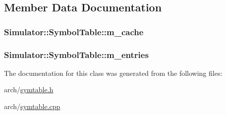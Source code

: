 \subsection{Member Data Documentation}
\hypertarget{class_simulator_1_1_symbol_table_a6262bb8f93af5d3f148455c160f3c647}{
\subsubsection[{m\+\_\+cache}]{ Simulator\+::\+Symbol\+Table\+::m\+\_\+cache\hspace{0.3cm}{\ttfamily [protected]}}}\label{class_simulator_1_1_symbol_table_a6262bb8f93af5d3f148455c160f3c647}
\hypertarget{class_simulator_1_1_symbol_table_a81da2f70b6f00568d464924c85c5f6d3}{
\subsubsection[{m\+\_\+entries}]{ Simulator\+::\+Symbol\+Table\+::m\+\_\+entries\hspace{0.3cm}{\ttfamily [protected]}}}\label{class_simulator_1_1_symbol_table_a81da2f70b6f00568d464924c85c5f6d3}


The documentation for this class was generated from the following files\+:\begin{DoxyCompactItemize}
\item 
arch/\hyperlink{symtable_8h}{symtable.\+h}\item 
arch/\hyperlink{symtable_8cpp}{symtable.\+cpp}\end{DoxyCompactItemize}

